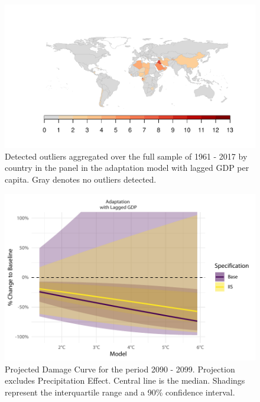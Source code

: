 \documentclass[11pt, letterpaper]{article}
\numberwithin{algorithm}{section}
\numberwithin{assumption}{section}
\numberwithin{lemma}{section}
\numberwithin{theorem}{section}
\numberwithin{corollary}{section}
\numberwithin{remark}{section}
\numberwithin{equation}{section}
\numberwithin{figure}{section}
\numberwithin{table}{section}
\begin{document}
\begin{figure}[!htbp]  \vspace{-.35in}
\centering
\includegraphics[width = \textwidth]{ctry_map_adapt.L1.pdf}
\caption{Detected outliers aggregated over the full sample of 1961 - 2017 by country in the panel in the adaptation model with lagged GDP per capita. Gray denotes no outliers detected.}
\label{fig_map_app2_appendix}
\end{figure}

\begin{figure}[!htbp]  \vspace{-.35in}
\centering
\includegraphics[width = \textwidth]{projections_noprcp_appendix.pdf}
\caption{Projected Damage Curve for the period 2090 - 2099. Projection excludes Precipitation Effect. Central line is the median. Shadings represent the interquartile range and a 90\% confidence interval.}
\label{fig_projection_lagged_noprcp}
\end{figure}
\end{document}
